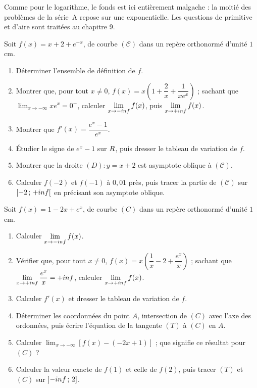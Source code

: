 \begin{annales}
Comme pour le logarithme, le fonds est ici entièrement malgache : la moitié
des problèmes de la série~A repose sur une exponentielle. Les questions de
primitive et d'aire sont traitées au chapitre 9.

Soit $f(x) = x+2+e^{-x}$, de courbe $(\mathcal C)$ dans un repère orthonormé
d'unité $1$ cm.
\begin{enumerate}[label=\textbf{\alph*)}, leftmargin=*, itemsep=0.15em]
  \item Déterminer l'ensemble de définition de $f$.
  \item Montrer que, pour tout $x \neq 0$,
        $f(x) = x\left(1+\dfrac2x+\dfrac{1}{xe^{x}}\right)$ ; sachant que
        $\displaystyle\lim_{x \to -\infty} xe^{x} = 0^{-}$, calculer
        $\limminf f(x)$, puis $\limpinf f(x)$.
  \item Montrer que $f'(x) = \dfrac{e^{x}-1}{e^{x}}$.
  \item Étudier le signe de $e^{x}-1$ sur $R$, puis dresser le tableau de
        variation de $f$.
  \item Montrer que la droite $(D) : y = x+2$ est asymptote oblique à
        $(\mathcal C)$.
  \item Calculer $f(-2)$ et $f(-1)$ à $0{,}01$ près, puis tracer la partie
        de $(\mathcal C)$ sur $\left[-2\,;\,+inf\right[$ en précisant son
        asymptote oblique.
\end{enumerate}

Soit $f(x) = 1-2x+e^{x}$, de courbe $(C)$ dans un repère orthonormé d'unité
$1$ cm.
\begin{enumerate}[label=\textbf{\alph*)}, leftmargin=*, itemsep=0.15em]
  \item Calculer $\limminf f(x)$.
  \item Vérifier que, pour tout $x \neq 0$,
        $f(x) = x\left(\dfrac1x-2+\dfrac{e^{x}}{x}\right)$ ; sachant que
        $\limpinf \dfrac{e^{x}}{x} = +\infty$, calculer $\limpinf f(x)$.
  \item Calculer $f'(x)$ et dresser le tableau de variation de $f$.
  \item Déterminer les coordonnées du point $A$, intersection de $(C)$ avec
        l'axe des ordonnées, puis écrire l'équation de la tangente $(T)$ à
        $(C)$ en $A$.
  \item Calculer $\displaystyle\lim_{x \to -\infty}
        \left[f(x)-(-2x+1)\right]$ ; que signifie ce résultat pour $(C)$ ?
  \item Calculer la valeur exacte de $f(1)$ et celle de $f(2)$, puis tracer
        $(T)$ et $(C)$ sur $\left]-inf\,;\,2\right]$.
\end{enumerate}


\end{annales}
